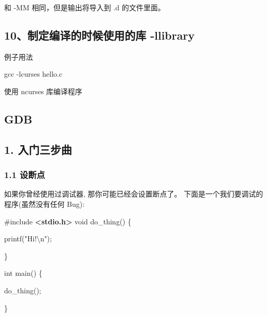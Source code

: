 \documentclass[
]{article}
\newenvironment{Shaded}{}{}
\newcommand{\DataTypeTok}[1]{\textcolor[rgb]{0.56,0.13,0.00}{#1}}
\newcommand{\ImportTok}[1]{\textcolor[rgb]{0.00,0.50,0.00}{\textbf{#1}}}
\newcommand{\NormalTok}[1]{#1}
\newcommand{\OperatorTok}[1]{\textcolor[rgb]{0.40,0.40,0.40}{#1}}
\newcommand{\PreprocessorTok}[1]{\textcolor[rgb]{0.74,0.48,0.00}{#1}}
\newcommand{\SpecialCharTok}[1]{\textcolor[rgb]{0.25,0.44,0.63}{#1}}
\newcommand{\StringTok}[1]{\textcolor[rgb]{0.25,0.44,0.63}{#1}}
\begin{document}
和 -MM 相同，但是输出将导入到 .d 的文件里面。

\hypertarget{10ux5236ux5b9aux7f16ux8bd1ux7684ux65f6ux5019ux4f7fux7528ux7684ux5e93--llibrary}{%
\subsection{\texorpdfstring{10、制定编译的时候使用的库
\textbf{-llibrary}}{10、制定编译的时候使用的库 -llibrary}}\label{10ux5236ux5b9aux7f16ux8bd1ux7684ux65f6ux5019ux4f7fux7528ux7684ux5e93--llibrary}}

例子用法

\begin{Shaded}
\begin{Highlighting}[]
\NormalTok{gcc {-}lcurses hello.c}
\end{Highlighting}
\end{Shaded}

使用 ncurses 库编译程序

\hypertarget{gdb}{%
\subsection{GDB}\label{gdb}}

\hypertarget{1-ux5165ux95e8ux4e09ux6b65ux66f2}{%
\subsection{1. 入门三步曲}\label{1-ux5165ux95e8ux4e09ux6b65ux66f2}}

\hypertarget{11-ux8bbeux65adux70b9}{%
\subsubsection{1.1 设断点}\label{11-ux8bbeux65adux70b9}}

如果你曾经使用过调试器, 那你可能已经会设置断点了。
下面是一个我们要调试的程序(虽然没有任何 Bug):

\begin{Shaded}
\begin{Highlighting}[]
\PreprocessorTok{\#include }\ImportTok{\textless{}stdio.h\textgreater{}}\PreprocessorTok{
}
\DataTypeTok{void}\NormalTok{ do\_thing}\OperatorTok{()} \OperatorTok{\{}

\NormalTok{ printf}\OperatorTok{(}\StringTok{"Hi!}\SpecialCharTok{\textbackslash{}n}\StringTok{"}\OperatorTok{);}

\OperatorTok{\}}

\DataTypeTok{int}\NormalTok{ main}\OperatorTok{()} \OperatorTok{\{}

\NormalTok{ do\_thing}\OperatorTok{();}

\OperatorTok{\}}
\end{Highlighting}
\end{Shaded}
\end{document}
